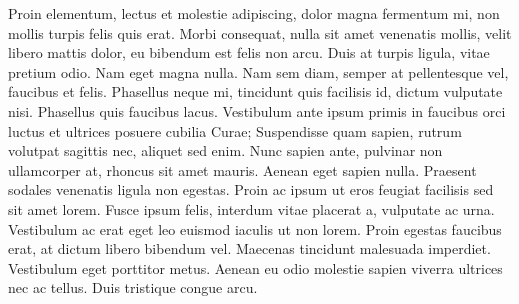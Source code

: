 Proin elementum, lectus et molestie adipiscing, dolor magna fermentum mi, non 
mollis turpis felis quis erat. Morbi consequat, nulla sit amet venenatis mollis, 
velit libero mattis dolor, eu bibendum est felis non arcu. Duis at turpis ligula, 
vitae pretium odio. Nam eget magna nulla. Nam sem diam, semper at pellentesque 
vel, faucibus et felis. Phasellus neque mi, tincidunt quis facilisis id, dictum 
vulputate nisi. Phasellus quis faucibus lacus. Vestibulum ante ipsum primis in 
faucibus orci luctus et ultrices posuere cubilia Curae; Suspendisse quam sapien, 
rutrum volutpat sagittis nec, aliquet sed enim. Nunc sapien ante, pulvinar non 
ullamcorper at, rhoncus sit amet mauris. Aenean eget sapien nulla. Praesent 
sodales venenatis ligula non egestas. Proin ac ipsum ut eros feugiat facilisis sed 
sit amet lorem. Fusce ipsum felis, interdum vitae placerat a, vulputate ac urna. 
Vestibulum ac erat eget leo euismod iaculis ut non lorem. Proin egestas faucibus 
erat, at dictum libero bibendum vel. Maecenas tincidunt malesuada imperdiet. 
Vestibulum eget porttitor metus. Aenean eu odio molestie sapien viverra ultrices 
nec ac tellus. Duis tristique congue arcu.
%
